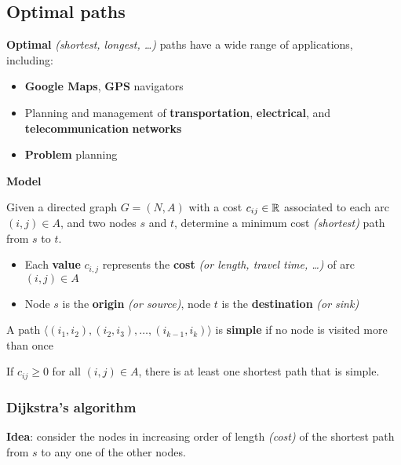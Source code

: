 \documentclass[english]{article}
\begin{document}
\subsection{Optimal paths}

\textbf{Optimal} \textit{(shortest, longest, \ldots)} paths have a wide range of applications, including:

\begin{itemize}
  \item \textbf{Google Maps}, \textbf{GPS} navigators
  \item Planning and management of \textbf{transportation}, \textbf{electrical}, and \textbf{telecommunication} \textbf{networks}
  \item \textbf{Problem} planning
\end{itemize}

\bigskip
\textbf{Model}

Given a directed graph \(G = (N, A)\) with a cost \(c_{ij} \in \mathbb{R}\) associated to each arc \((i, j) \in A\), and two nodes \(s\) and \(t\), determine a minimum cost \textit{(shortest)} path from \(s\) to \(t\).

\begin{itemize}
  \item Each \textbf{value} \(c_{i, j}\) represents the \textbf{cost} \textit{(or length, travel time, \ldots)} of arc \((i, j) \in A\)
  \item Node \(s\) is the \textbf{origin} \textit{(or source)}, node \(t\) is the \textbf{destination} \textit{(or sink)}
\end{itemize}

\begin{property}
  A path \(\langle (i_1, i_2), (i_2, i_3), \ldots, (i_{k-1}, i_k)  \rangle\) is \textbf{simple} if no node is visited more than once
\end{property}

\begin{property}
  If \(c_{ij} \geq 0\) for all \((i, j) \in A\), there is at least one shortest path that is simple.
\end{property}

\subsubsection{Dijkstra's algorithm}

\textbf{Idea}: consider the nodes in increasing order of length \textit{(cost)} of the shortest path from \(s\) to any one of the other nodes.
\end{document}
